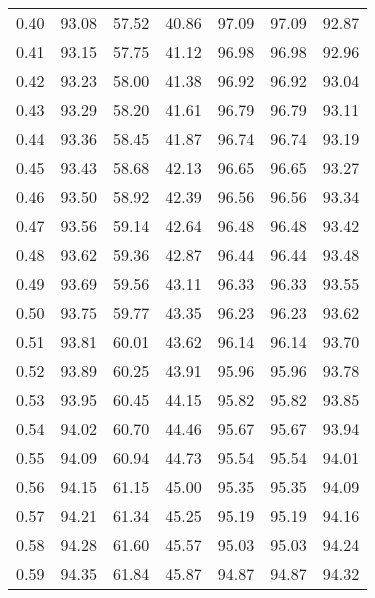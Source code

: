 \begin{tabular}{|c|c|c|c|c|c|c|}
      0.40 &     93.08 &     57.52 &      40.86 &   97.09 &      97.09 &         92.87 \\
      0.41 &     93.15 &     57.75 &      41.12 &   96.98 &      96.98 &         92.96 \\
      0.42 &     93.23 &     58.00 &      41.38 &   96.92 &      96.92 &         93.04 \\
      0.43 &     93.29 &     58.20 &      41.61 &   96.79 &      96.79 &         93.11 \\
      0.44 &     93.36 &     58.45 &      41.87 &   96.74 &      96.74 &         93.19 \\
      0.45 &     93.43 &     58.68 &      42.13 &   96.65 &      96.65 &         93.27 \\
      0.46 &     93.50 &     58.92 &      42.39 &   96.56 &      96.56 &         93.34 \\
      0.47 &     93.56 &     59.14 &      42.64 &   96.48 &      96.48 &         93.42 \\
      0.48 &     93.62 &     59.36 &      42.87 &   96.44 &      96.44 &         93.48 \\
      0.49 &     93.69 &     59.56 &      43.11 &   96.33 &      96.33 &         93.55 \\
      0.50 &     93.75 &     59.77 &      43.35 &   96.23 &      96.23 &         93.62 \\
      0.51 &     93.81 &     60.01 &      43.62 &   96.14 &      96.14 &         93.70 \\
      0.52 &     93.89 &     60.25 &      43.91 &   95.96 &      95.96 &         93.78 \\
      0.53 &     93.95 &     60.45 &      44.15 &   95.82 &      95.82 &         93.85 \\
      0.54 &     94.02 &     60.70 &      44.46 &   95.67 &      95.67 &         93.94 \\
      0.55 &     94.09 &     60.94 &      44.73 &   95.54 &      95.54 &         94.01 \\
      0.56 &     94.15 &     61.15 &      45.00 &   95.35 &      95.35 &         94.09 \\
      0.57 &     94.21 &     61.34 &      45.25 &   95.19 &      95.19 &         94.16 \\
      0.58 &     94.28 &     61.60 &      45.57 &   95.03 &      95.03 &         94.24 \\
      0.59 &     94.35 &     61.84 &      45.87 &   94.87 &      94.87 &         94.32 \\

\end{tabular}
